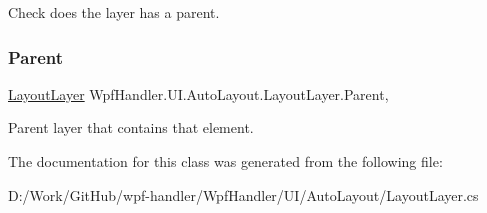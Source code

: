 Check does the layer has a parent. 

\mbox{\label{class_wpf_handler_1_1_u_i_1_1_auto_layout_1_1_layout_layer_a6c500688328621ecf68522d0660338e0}} 
\subsubsection{\texorpdfstring{Parent}{Parent}}
{\footnotesize\ttfamily \mbox{\hyperlink{class_wpf_handler_1_1_u_i_1_1_auto_layout_1_1_layout_layer}{Layout\+Layer}} Wpf\+Handler.\+U\+I.\+Auto\+Layout.\+Layout\+Layer.\+Parent\hspace{0.3cm}{\ttfamily [get]}, {}}



Parent layer that contains that element. 



The documentation for this class was generated from the following file\+:\begin{DoxyCompactItemize}
\item 
D\+:/\+Work/\+Git\+Hub/wpf-\/handler/\+Wpf\+Handler/\+U\+I/\+Auto\+Layout/Layout\+Layer.\+cs\end{DoxyCompactItemize}
